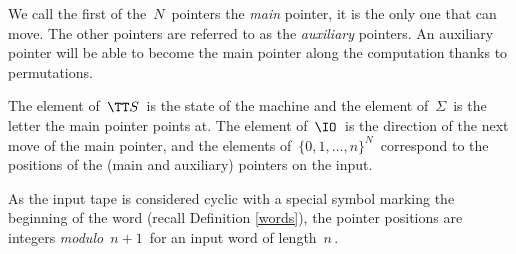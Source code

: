 We call the first of the $\,N\,$ pointers the \emph{main} pointer, it is the only one that can move.
The other pointers are referred to as the \emph{auxiliary} pointers.
An auxiliary pointer will be able to become the main pointer along the computation thanks to permutations.

The element of $\,\TT S\,$ is the state of the machine and the element of $\,\Sigma\,$ is the letter the main pointer points at.
The element of $\,\IO\,$ is the direction of the next move of the main pointer, and the elements of $\,\{0,1,\dots,n\}^N\,$ correspond to the positions of the (main and auxiliary)  pointers on the input.

\smallskip

As the input tape is considered cyclic with a special symbol marking the beginning of the word (recall Definition \ref{words}), the pointer positions are integers \emph{modulo} $\,n+1\,$ for an input word of length $\,n\,$.


